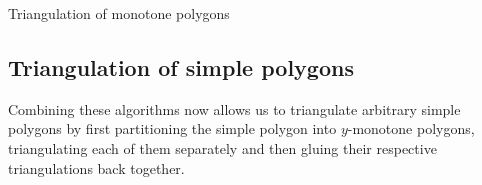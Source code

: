         \begin{breakablealgorithm}
            \caption{Triangulation of monotone polygons}
            \label{alg:monotone_triangulation}
            \begin{algorithmic}[1]
                        \EndWhile
                        \Else
                                \EndIf
                            \EndWhile
                        \EndIf
                    \EndFor
                    \EndWhile
                    \State{}
                \EndProcedure
            \end{algorithmic}
        \end{breakablealgorithm}

    \subsection{Triangulation of simple polygons}
        Combining these algorithms now allows us to triangulate arbitrary simple polygons by first partitioning the simple polygon into $y$-monotone polygons, triangulating each of them separately and then gluing their respective triangulations back together. 

